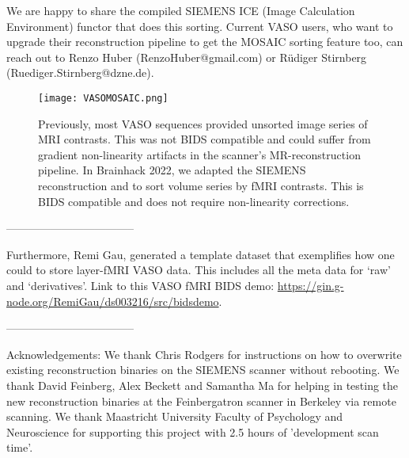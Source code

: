 \documentclass[../main.tex]{subfiles}
\begin{document}
We are happy to share the compiled SIEMENS ICE (Image Calculation Environment) functor that does this sorting. Current VASO users, who want to upgrade their reconstruction pipeline to get the MOSAIC sorting feature too, can reach out to Renzo Huber (RenzoHuber@gmail.com) or R\"udiger Stirnberg (Ruediger.Stirnberg@dzne.de).

\begin{figure}
	\centering
	\texttt{[image: VASOMOSAIC.png]}
	\caption{Previously, most VASO sequences provided unsorted image series of MRI contrasts. This was not BIDS compatible and could suffer from gradient non-linearity artifacts in the scanner’s MR-reconstruction pipeline. In Brainhack 2022, we adapted the SIEMENS reconstruction and to sort volume series by fMRI contrasts. This is BIDS compatible and does not require non-linearity corrections.
}
	\label{fig:VASOMOSAIC}
\end{figure}

-----------------------------------

Furthermore, Remi Gau, generated a template dataset that exemplifies how one could to store layer-fMRI VASO data. This includes all the meta data for ‘raw’ and ‘derivatives’. Link to this VASO fMRI BIDS demo: \href{https://gin.g-node.org/RemiGau/ds003216/src/bids_demo}{https://gin.g-node.org/RemiGau/ds003216/src/bids\textunderscore demo}.

-----------------------------------

Acknowledgements: We thank Chris Rodgers for instructions on how to overwrite existing reconstruction binaries on the SIEMENS scanner without rebooting. We thank David Feinberg, Alex Beckett and Samantha Ma for helping in testing the new reconstruction binaries at the Feinbergatron scanner in Berkeley via remote scanning. We thank Maastricht University Faculty of Psychology and Neuroscience for supporting this project with 2.5 hours of 'development scan time'.

\printbibliography
\end{document}
